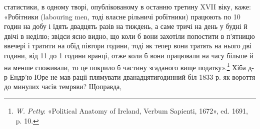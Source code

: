 статистики, в одному творі, опублікованому в останню
третину XVII віку, каже: «Робітники (labouring men, тоді власне
рільничі робітники) працюють по 10 годин на добу і їдять двадцять
разів на тиждень, а саме тричі на день у будні й двічі в неділю;
звідси ясно видно, що коли б вони захотіли попостити в
п’ятницю ввечері і тратити на обід півтори години, тоді як тепер
вони тратять на нього дві години, від 11 до 1 години вранці, отже
коли б вони працювали на  часу більше й на  менше споживали,
то це покрило б  частину згаданого вище податку».\footnote{
\emph{W. Petty}: «Political Anatomy of Ireland, Verbum Sapienti, 1672»,
ed. 1691, p. 10.
}
Хіба д-р Ендр’ю Юре не мав рації плямувати дванадцятигодинний
біл 1833 р. як вороття до минулих часів темряви? Щоправда,
\parbreak{}  %
